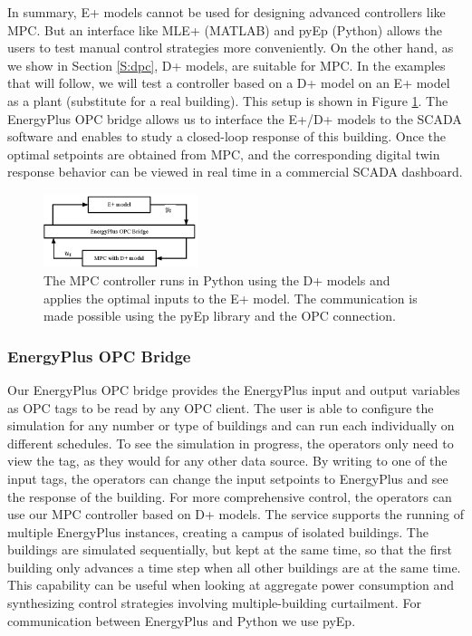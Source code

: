 In summary, E+ models cannot be used for designing advanced controllers like MPC. 
But an interface like MLE+ (MATLAB) and pyEp (Python) allows the users to test manual control strategies more conveniently.
On the other hand, as we show in Section \ref{S:dpc}, D+ models, are suitable for MPC.
In the examples that will follow, we will test a controller based on a D+ model on an E+ model as a plant (substitute for a real building).
This setup is shown in Figure \ref{F:control}.
The EnergyPlus OPC bridge allows us to interface the E+/D+ models to the SCADA software and enables to study a closed-loop response of this building.
Once the optimal setpoints are obtained from MPC, and the corresponding digital twin response behavior can be viewed in real time in a commercial SCADA dashboard.

\begin{figure}[t]
	\centering
	\includegraphics[width=0.4\textwidth]{images/control.eps}
	\caption{The MPC controller runs in Python using the D+ models and applies the optimal inputs to the E+ model. The communication is made possible using the pyEp library and the OPC connection.}
	\label{F:control}
\end{figure}

\subsubsection{EnergyPlus OPC Bridge}

Our EnergyPlus OPC bridge provides the EnergyPlus input and output variables as OPC tags to be read by any OPC client.
The user is able to configure the simulation for any number or type of buildings and can run each individually on different schedules.
To see the simulation in progress, the operators only need to view the tag, as they would for any other data source.
By writing to one of the input tags, the operators can change the input setpoints to EnergyPlus and see the response of the building.
For more comprehensive control, the operators can use our MPC controller based on D+ models.
The service supports the running of multiple EnergyPlus instances, creating a campus of isolated buildings.
The buildings are simulated sequentially, but kept at the same time, so that the first building only advances a time step when all other buildings are at the same time.
This capability can be useful when looking at aggregate power consumption and synthesizing control strategies involving multiple-building curtailment.
For communication between EnergyPlus and Python we use pyEp.

